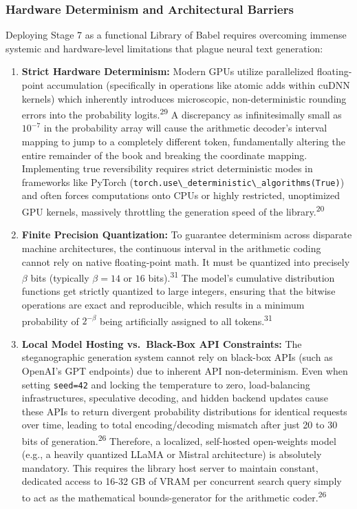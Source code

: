 \documentclass[
  11pt,
  a4paper,
]{article}
\newcommand{\passthrough}[1]{#1}
\begin{document}
\subsubsection{Hardware Determinism and Architectural Barriers}\label{hardware-determinism-and-architectural-barriers}

Deploying Stage 7 as a functional Library of Babel requires overcoming immense systemic and hardware-level limitations that plague neural text generation:

\begin{enumerate}
\def\labelenumi{\arabic{enumi}.}
\item
  \textbf{Strict Hardware Determinism:} Modern GPUs utilize parallelized floating-point accumulation (specifically in operations like atomic adds within cuDNN kernels) which inherently introduces microscopic, non-deterministic rounding errors into the probability logits.\textsuperscript{29} A discrepancy as infinitesimally small as \(10^{-7}\) in the probability array will cause the arithmetic decoder's interval mapping to jump to a completely different token, fundamentally altering the entire remainder of the book and breaking the coordinate mapping. Implementing true reversibility requires strict deterministic modes in frameworks like PyTorch (\passthrough{\lstinline!torch.use\_deterministic\_algorithms(True)!}) and often forces computations onto CPUs or highly restricted, unoptimized GPU kernels, massively throttling the generation speed of the library.\textsuperscript{20}
\item
  \textbf{Finite Precision Quantization:} To guarantee determinism across disparate machine architectures, the continuous interval in the arithmetic coding cannot rely on native floating-point math. It must be quantized into precisely \(\beta\) bits (typically \(\beta=14\) or \(16\) bits).\textsuperscript{31} The model's cumulative distribution functions get strictly quantized to large integers, ensuring that the bitwise operations are exact and reproducible, which results in a minimum probability of \(2^{-\beta}\) being artificially assigned to all tokens.\textsuperscript{31}
\item
  \textbf{Local Model Hosting vs.~Black-Box API Constraints:} The steganographic generation system cannot rely on black-box APIs (such as OpenAI's GPT endpoints) due to inherent API non-determinism. Even when setting \passthrough{\lstinline!seed=42!} and locking the temperature to zero, load-balancing infrastructures, speculative decoding, and hidden backend updates cause these APIs to return divergent probability distributions for identical requests over time, leading to total encoding/decoding mismatch after just 20 to 30 bits of generation.\textsuperscript{26} Therefore, a localized, self-hosted open-weights model (e.g., a heavily quantized LLaMA or Mistral architecture) is absolutely mandatory. This requires the library host server to maintain constant, dedicated access to 16-32 GB of VRAM per concurrent search query simply to act as the mathematical bounds-generator for the arithmetic coder.\textsuperscript{26}
\end{enumerate}
\end{document}
